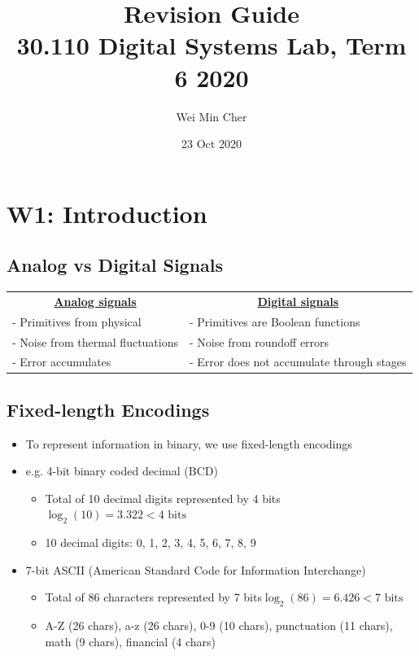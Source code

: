 \documentclass[a4paper]{article}
\begin{document}
\title{Revision Guide\\[0.1cm]
    \large 30.110 Digital Systems Lab, Term 6 2020}
\author{Wei Min Cher}
\date{23 Oct 2020}

\maketitle

\tableofcontents

\newpage
\section{W1: Introduction}

\subsection{Analog vs Digital Signals}
\begin{table}[H]
\centering
\begin{tabular}{ll}
\multicolumn{1}{c}{{\ul \textbf{Analog signals}}} & \multicolumn{1}{c}{{\ul \textbf{Digital signals}}} \\
- Primitives from physical & - Primitives are Boolean functions \\
- Noise from thermal fluctuations & - Noise from roundoff errors \\
- Error accumulates & - Error does not accumulate through stages
\end{tabular}
\end{table}

\subsection{Fixed-length Encodings}
\begin{itemize}
    \item To represent information in binary, we use fixed-length encodings
    \item e.g. 4-bit binary coded decimal (BCD)
    \begin{itemize}[label=$\circ$]
        \item Total of 10 decimal digits represented by 4 bits\quad $\log_2(10) = 3.322 < 4\text{ bits}$
        \item 10 decimal digits: 0, 1, 2, 3, 4, 5, 6, 7, 8, 9
    \end{itemize}
    \item 7-bit ASCII (American Standard Code for Information Interchange)
    \begin{itemize}[label=$\circ$]
        \item Total of 86 characters represented by 7 bits\quad $\log_2(86) = 6.426 < 7\text{ bits}$
        \item A-Z (26 chars), a-z (26 chars), 0-9 (10 chars), punctuation (11 chars), math (9 chars), financial (4 chars)
    \end{itemize}
\end{itemize}
\end{document}
